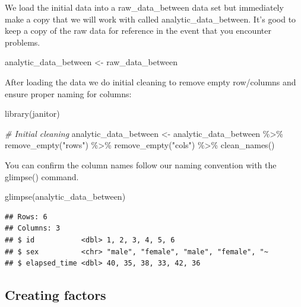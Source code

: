 \documentclass[
]{krantz}
\makeatletter
\newenvironment{Shaded}{\begin{snugshade}}{\end{snugshade}}
\newcommand{\CommentTok}[1]{\textcolor[rgb]{0.37,0.37,0.37}{\textit{#1}}}
\newcommand{\FunctionTok}[1]{\textcolor[rgb]{0,0,0}{#1}}
\newcommand{\NormalTok}[1]{#1}
\newcommand{\OtherTok}[1]{\textcolor[rgb]{0.37,0.37,0.37}{#1}}
\newcommand{\SpecialCharTok}[1]{\textcolor[rgb]{0,0,0}{#1}}
\newcommand{\StringTok}[1]{\textcolor[rgb]{0.5,0.5,0.5}{#1}}
\newenvironment{kframe}{%
\medskip{}
\setlength{\fboxsep}{.8em}
 \def\at@end@of@kframe{}%
 \ifinner\ifhmode%
  \def\at@end@of@kframe{\end{minipage}}%
  \begin{minipage}{\columnwidth}%
 \fi\fi%
 \def\FrameCommand##1{\hskip\@totalleftmargin \hskip-\fboxsep
 \colorbox{shadecolor}{##1}\hskip-\fboxsep
     \hskip-\linewidth \hskip-\@totalleftmargin \hskip\columnwidth}%
 \MakeFramed {\advance\hsize-\width
   \@totalleftmargin\z@ \linewidth\hsize
   \@setminipage}}%
 {\par\unskip\endMakeFramed%
 \at@end@of@kframe}
\renewenvironment{Shaded}{\begin{kframe}}{\end{kframe}}
\makeatother
\begin{document}
We load the initial data into a raw\_data\_between data set but immediately make a copy that we will work with called analytic\_data\_between. It's good to keep a copy of the raw data for reference in the event that you encounter problems.

\begin{Shaded}
\begin{Highlighting}[]
\NormalTok{analytic\_data\_between }\OtherTok{\textless{}{-}}\NormalTok{ raw\_data\_between}
\end{Highlighting}
\end{Shaded}

After loading the data we do initial cleaning to remove empty row/columns and ensure proper naming for columns:

\begin{Shaded}
\begin{Highlighting}[]
\FunctionTok{library}\NormalTok{(janitor)}

\CommentTok{\# Initial cleaning}
\NormalTok{analytic\_data\_between }\OtherTok{\textless{}{-}}\NormalTok{ analytic\_data\_between }\SpecialCharTok{\%\textgreater{}\%}
  \FunctionTok{remove\_empty}\NormalTok{(}\StringTok{"rows"}\NormalTok{) }\SpecialCharTok{\%\textgreater{}\%}
  \FunctionTok{remove\_empty}\NormalTok{(}\StringTok{"cols"}\NormalTok{) }\SpecialCharTok{\%\textgreater{}\%}
  \FunctionTok{clean\_names}\NormalTok{()}
\end{Highlighting}
\end{Shaded}

You can confirm the column names follow our naming convention with the glimpse() command.

\begin{Shaded}
\begin{Highlighting}[]
\FunctionTok{glimpse}\NormalTok{(analytic\_data\_between)}
\end{Highlighting}
\end{Shaded}

\begin{verbatim}
## Rows: 6
## Columns: 3
## $ id           <dbl> 1, 2, 3, 4, 5, 6
## $ sex          <chr> "male", "female", "male", "female", "~
## $ elapsed_time <dbl> 40, 35, 38, 33, 42, 36
\end{verbatim}

\hypertarget{creating-factors}{%
\subsection{Creating factors}\label{creating-factors}}
\end{document}
